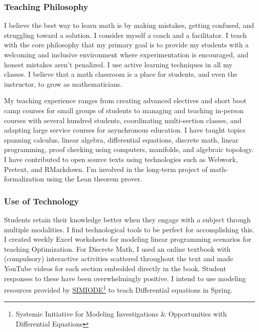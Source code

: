 \documentclass[
]{report}
\begin{document}
\hypertarget{teaching-philosophy}{%
\subsubsection*{Teaching Philosophy}\label{teaching-philosophy}}


I believe the best way to learn math is by making mistakes, getting confused, and struggling toward a solution. I consider myself a coach and a facilitator. I teach with the core philosophy that my primary goal is to provide my students with a welcoming and inclusive environment where experimentation is encouraged, and honest mistakes aren't penalized. I use active learning techniques in all my classes. I believe that a math classroom is a place for students, and even the instructor, to grow as mathematicians.

My teaching experience ranges from creating advanced electives and short boot camp courses for small groups of students to managing and teaching in-person courses with several hundred students, coordinating multi-section classes, and adapting large service courses for asynchronous education. I have taught topics spanning calculus, linear algebra, differential equations, discrete math, linear programming, proof checking using computers, manifolds, and algebraic topology. I have contributed to open source texts using technologies such as Webwork, Pretext, and RMarkdown. I'm involved in the long-term project of math-formalization using the Lean theorem prover.

\hypertarget{use-of-technology}{%
\subsubsection*{Use of Technology}\label{use-of-technology}}


Students retain their knowledge better when they engage with a subject through multiple modalities. I find technological tools to be perfect for accomplishing this. I created weekly Excel worksheets for modeling linear programming scenarios for teaching Optimization. For Discrete Math, I used an online textbook with (compulsory) interactive activities scattered throughout the text and made YouTube videos for each section embedded directly in the book. Student responses to these have been overwhelmingly positive.
I intend to use modeling resources provided by \href{https://qubeshub.org/community/groups/simiode}{SIMIODE}\footnote{Systemic Initiative for Modeling Investigations \& Opportunities with Differential Equations} to teach Differential equations in Spring.
\end{document}
